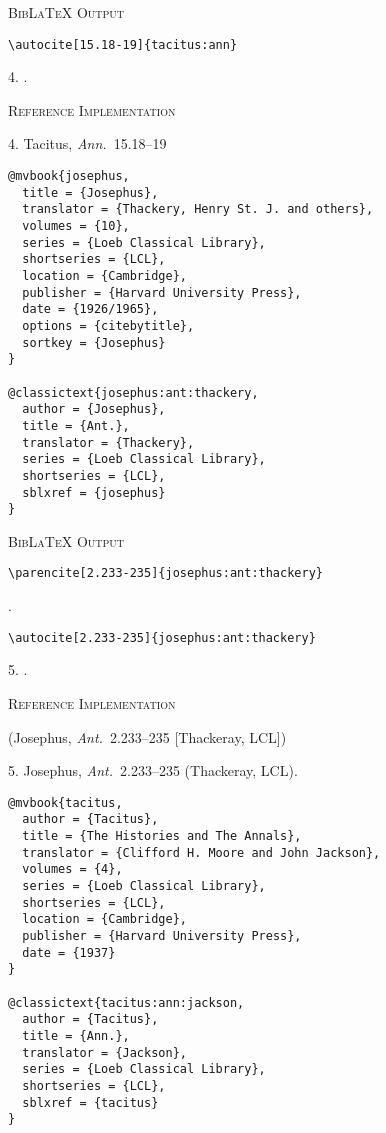 \documentclass[a4paper]{article}
\newenvironment{refimp}{%
  \begin{minipage}{\linewidth}
    \setlength{\parskip}{1ex}
    \textsc{Reference Implementation}\par
    \nobreak
    \color{reference-colour}
}{\end{minipage}}
\begin{document}
{\textsc{BibLaTeX Output}\par
  \nobreak
  \texttt{\textbackslash autocite[15.18-19]\{tacitus:ann\}}\par
  \color{biblatex-colour}
4. \cite[15.18-19]{tacitus:ann}.\par}

\begin{refimp}
  4. Tacitus, \emph{Ann.}\ 15.18–19
\end{refimp}

\begin{lstlisting}
@mvbook{josephus,
  title = {Josephus},
  translator = {Thackery, Henry St. J. and others},
  volumes = {10},
  series = {Loeb Classical Library},
  shortseries = {LCL},
  location = {Cambridge},
  publisher = {Harvard University Press},
  date = {1926/1965},
  options = {citebytitle},
  sortkey = {Josephus}
}

@classictext{josephus:ant:thackery,
  author = {Josephus},
  title = {Ant.},
  translator = {Thackery},
  series = {Loeb Classical Library},
  shortseries = {LCL},
  sblxref = {josephus}
}
\end{lstlisting}

{\textsc{BibLaTeX Output}\par
  \nobreak
  \texttt{\textbackslash parencite[2.233-235]\{josephus:ant:thackery\}}\par
  \color{biblatex-colour}
  \parencite[2.233-235]{josephus:ant:thackery}.\par
  \color{black}
  \texttt{\textbackslash autocite[2.233-235]\{josephus:ant:thackery\}}\par
  \color{biblatex-colour}
5. \cite[2.233-235]{josephus:ant:thackery}.\par}

\begin{refimp}
  (Josephus, \emph{Ant.}\ 2.233–235 [Thackeray, LCL])

  5. Josephus, \emph{Ant.}\ 2.233–235 (Thackeray, LCL).
\end{refimp}

\begin{lstlisting}
@mvbook{tacitus,
  author = {Tacitus},
  title = {The Histories and The Annals},
  translator = {Clifford H. Moore and John Jackson},
  volumes = {4},
  series = {Loeb Classical Library},
  shortseries = {LCL},
  location = {Cambridge},
  publisher = {Harvard University Press},
  date = {1937}
}

@classictext{tacitus:ann:jackson,
  author = {Tacitus},
  title = {Ann.},
  translator = {Jackson},
  series = {Loeb Classical Library},
  shortseries = {LCL},
  sblxref = {tacitus}
}
\end{lstlisting}
\end{document}
